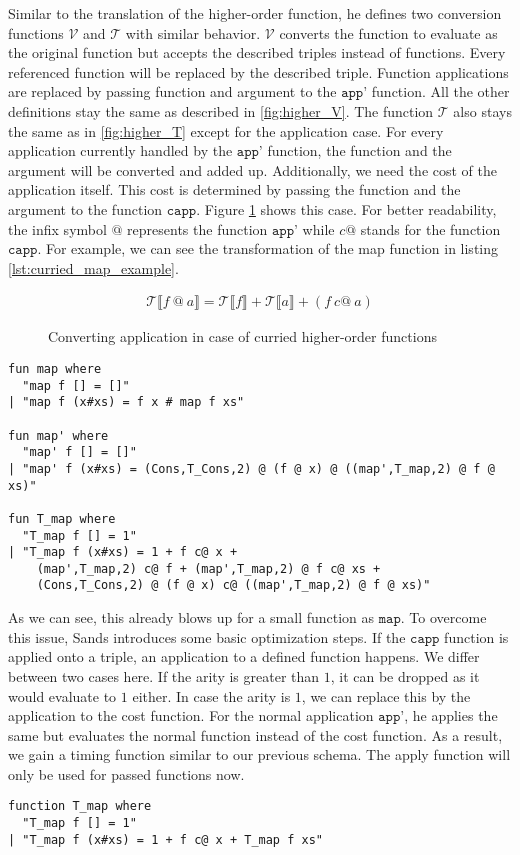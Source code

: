 Similar to the translation of the higher-order function, he defines two conversion functions $\mathcal{V}$ and $\mathcal{T}$ with similar behavior.
$\mathcal{V}$ converts the function to evaluate as the original function but accepts the described triples instead of functions.
Every referenced function will be replaced by the described triple.
Function applications are replaced by passing function and argument to the $\texttt{app'}$ function.
All the other definitions stay the same as described in \ref{fig:higher_V}.
The function $\mathcal{T}$ also stays the same as in \ref{fig:higher_T} except for the application case.
For every application currently handled by the $\texttt{app'}$ function, the function and the argument will be converted and added up.
Additionally, we need the cost of the application itself.
This cost is determined by passing the function and the argument to the function $\texttt{capp}$.
Figure \ref{fig:curried_T_apply} shows this case.
For better readability, the infix symbol $@$ represents the function $\texttt{app'}$ while $c@$ stands for the function $\texttt{capp}$.
For example, we can see the transformation of the map function in listing \ref{lst:curried_map_example}.
\begin{figure}
\begin{align*}
  \mathcal{T}\llbracket f\ @\ a\rrbracket = \mathcal{T}\llbracket f\rrbracket + \mathcal{T}\llbracket a\rrbracket + (f\ c@\ a)
\end{align*}
\caption{Converting application in case of curried higher-order functions}
\label{fig:curried_T_apply}
\end{figure}

\begin{lstlisting}[language=isabelle,mathescape=true,label=lst:curried_map_example,caption=Example translation for map function]
fun map where
  "map f [] = []"
| "map f (x#xs) = f x # map f xs"

fun map' where
  "map' f [] = []"
| "map' f (x#xs) = (Cons,T_Cons,2) @ (f @ x) @ ((map',T_map,2) @ f @ xs)"

fun T_map where
  "T_map f [] = 1"
| "T_map f (x#xs) = 1 + f c@ x +
    (map',T_map,2) c@ f + (map',T_map,2) @ f c@ xs +
    (Cons,T_Cons,2) @ (f @ x) c@ ((map',T_map,2) @ f @ xs)"
\end{lstlisting}

As we can see, this already blows up for a small function as $\texttt{map}$.
To overcome this issue, Sands introduces some basic optimization steps.
If the $\texttt{capp}$ function is applied onto a triple, an application to a defined function happens.
We differ between two cases here.
If the arity is greater than $1$, it can be dropped as it would evaluate to $1$ either.
In case the arity is $1$, we can replace this by the application to the cost function.
For the normal application $\texttt{app'}$, he applies the same but evaluates the normal function instead of the cost function.
As a result, we gain a timing function similar to our previous schema.
The apply function will only be used for passed functions now.
\begin{lstlisting}[language=isabelle,mathescape=true]
function T_map where
  "T_map f [] = 1"
| "T_map f (x#xs) = 1 + f c@ x + T_map f xs"
\end{lstlisting}
